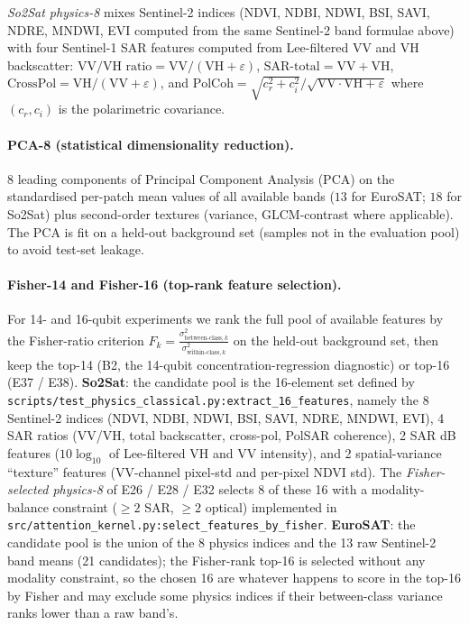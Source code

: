 \documentclass[pdflatex,sn-mathphys]{sn-jnl}
\theoremstyle{plain}
\theoremstyle{remark}
\theoremstyle{definition}
\begin{document}
\noindent \emph{So2Sat physics-8} mixes Sentinel-2 indices (NDVI, NDBI, NDWI, BSI, SAVI, NDRE, MNDWI, EVI computed from the same Sentinel-2 band formulae above) with four Sentinel-1 SAR features computed from Lee-filtered VV and VH backscatter:
$\text{VV/VH ratio}=\mathrm{VV}/(\mathrm{VH}+\varepsilon)$,
$\text{SAR-total}=\mathrm{VV}+\mathrm{VH}$,
$\text{CrossPol}=\mathrm{VH}/(\mathrm{VV}+\varepsilon)$, and
$\text{PolCoh} = \sqrt{c_r^2+c_i^2}/\sqrt{\mathrm{VV}\cdot\mathrm{VH}+\varepsilon}$
where $(c_r, c_i)$ is the polarimetric covariance.

\paragraph{PCA-8 (statistical dimensionality reduction).}
8 leading components of Principal Component Analysis (PCA) on the standardised per-patch mean values of all available bands ($13$ for EuroSAT; $18$ for So2Sat) plus second-order textures (variance, GLCM-contrast where applicable). The PCA is fit on a held-out background set (samples not in the evaluation pool) to avoid test-set leakage.

\paragraph{Fisher-14 and Fisher-16 (top-rank feature selection).}
For 14- and 16-qubit experiments we rank the full pool of available features by the Fisher-ratio criterion $F_k = \tfrac{\sigma^2_{\text{between-class},k}}{\sigma^2_{\text{within-class},k}}$ on the held-out background set, then keep the top-14 (B2, the 14-qubit concentration-regression diagnostic) or top-16 (E37 / E38). \textbf{So2Sat}: the candidate pool is the 16-element set defined by \texttt{scripts/test\_physics\_classical.py:extract\_16\_features}, namely the 8 Sentinel-2 indices (NDVI, NDBI, NDWI, BSI, SAVI, NDRE, MNDWI, EVI), 4 SAR ratios (VV/VH, total backscatter, cross-pol, PolSAR coherence), 2 SAR dB features ($10\log_{10}$ of Lee-filtered VH and VV intensity), and 2 spatial-variance ``texture'' features (VV-channel pixel-std and per-pixel NDVI std).  The \emph{Fisher-selected physics-8} of E26 / E28 / E32 selects 8 of these 16 with a modality-balance constraint ($\ge 2$ SAR, $\ge 2$ optical) implemented in \texttt{src/attention\_kernel.py:select\_features\_by\_fisher}.  \textbf{EuroSAT}: the candidate pool is the union of the 8 physics indices and the 13 raw Sentinel-2 band means (21 candidates); the Fisher-rank top-16 is selected without any modality constraint, so the chosen 16 are whatever happens to score in the top-16 by Fisher and may exclude some physics indices if their between-class variance ranks lower than a raw band's.
\end{document}
